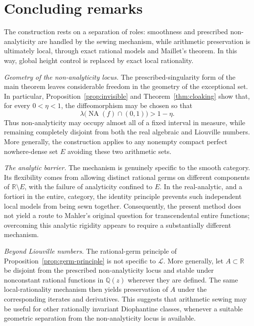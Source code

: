 \documentclass[11pt,reqno]{amsart}
\numberwithin{equation}{section}
\theoremstyle{definition}
\theoremstyle{remark}
\newcommand{\R}{\mathbb R}
\newcommand{\Q}{\mathbb Q}
\newcommand{\Lio}{\mathscr L}
\newcommand{\NA}{\operatorname{NA}}
\begin{document}
\section{Concluding remarks}\label{sec:concluding}

The construction rests on a separation of roles: smoothness and prescribed
non-analyticity are handled by the sewing mechanism, while arithmetic
preservation is ultimately local, through exact rational models and
Maillet's theorem. In this way, global height control is replaced by exact
local rationality.

\medskip

\noindent
\emph{Geometry of the non-analyticity locus.}
The prescribed-singularity form of the main theorem leaves considerable
freedom in the geometry of the exceptional set. In particular,
Proposition~\ref{prop:invisible} and Theorem~\ref{thm:cloaking} show that,
for every $0<\eta<1$, the diffeomorphism may be chosen so that
\[
\lambda\bigl(\NA(f)\cap(0,1)\bigr)>1-\eta.
\]
Thus non-analyticity may occupy almost all of a fixed interval in measure,
while remaining completely disjoint from both the real algebraic and
Liouville numbers. More generally, the construction applies to any nonempty
compact perfect nowhere-dense set $E$ avoiding these two arithmetic sets.

\medskip

\noindent
\emph{The analytic barrier.}
The mechanism is genuinely specific to the smooth category. Its flexibility
comes from allowing distinct rational germs on different components of
$\R\setminus E$, with the failure of analyticity confined to $E$. In the
real-analytic, and a fortiori in the entire, category, the identity principle
prevents such independent local models from being sewn together.
Consequently, the present method does not yield a route to Mahler's original
question for transcendental entire functions; overcoming this analytic
rigidity appears to require a substantially different mechanism.

\medskip

\noindent
\emph{Beyond Liouville numbers.}
The rational-germ principle of Proposition~\ref{prop:germ-principle} is not
specific to $\Lio$. More generally, let $A\subset\R$ be disjoint from the
prescribed non-analyticity locus and stable under nonconstant rational
functions in $\Q(z)$ wherever they are defined. The same local-rationality
mechanism then yields preservation of $A$ under the corresponding iterates
and derivatives. This suggests that arithmetic sewing may be useful for
other rationally invariant Diophantine classes, whenever a suitable
geometric separation from the non-analyticity locus is available.
\end{document}
